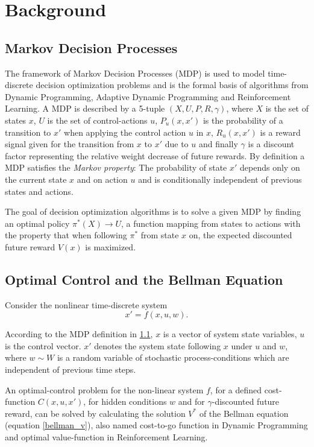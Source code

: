 \section{Background}
\label{background}

\subsection{Markov Decision Processes}
\label{mdp}
The framework of Markov Decision Processes (MDP) is used to model time-discrete decision optimization problems and is the formal basis of algorithms from Dynamic Programming, Adaptive Dynamic Programming and Reinforcement Learning. A MDP is described by a 5-tuple $(X, U, P, R, \gamma)$, where $X$ is the set of states $x$, $U$ is the set of control-actions $u$, $P_u(x, x')$ is the probability of a transition to $x'$ when applying the control action $u$ in $x$, $R_u(x, x')$ is a reward signal given for the transition from $x$ to $x'$ due to $u$ and finally $\gamma$ is a discount factor representing the relative weight decrease of future rewards. By definition a MDP satisfies the \textit{Markov property}: The probability of state $x'$ depends only on the current state $x$ and on action $u$ and is conditionally independent of previous states and actions.

The goal of decision optimization algorithms is to solve a given MDP by finding an optimal policy $\pi^*(X)\to U$, a function mapping from states to actions with the property that when following $\pi^*$ from state $x$ on, the expected discounted future reward $V(x)$ is maximized.

\subsection{Optimal Control and the Bellman Equation}
\label{optControl}
Consider the nonlinear time-discrete system
\begin{equation}
\label{non_linear_system}
x'=f(x, u, w).
\end{equation}

According to the MDP definition in \ref{mdp}, $x$ is a vector of system state variables, $u$ is the control vector. $x'$ denotes the system state following $x$ under $u$ and $w$, where $w\sim W$ is a random variable of stochastic process-conditions which are independent of previous time steps. 

An optimal-control problem for the non-linear system $f$, for a defined cost-function $C(x, u, x')$, for hidden conditions $w$ and for $\gamma$-discounted future reward, can be solved by calculating the solution $V^*$ of the Bellman equation (equation \ref{bellman_v}), also named cost-to-go function in Dynamic Programming and optimal value-function in Reinforcement Learning.

